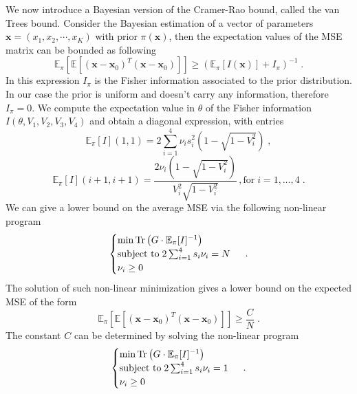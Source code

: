 \documentclass[aps, pra, 10pt, twocolumn, superscriptaddress,floatfix]{revtex4-1}
\DeclareMathOperator{\tr}{Tr}
\begin{document}
We now introduce a Bayesian version of the Cramer-Rao bound, called the van Trees bound. Consider the Bayesian estimation of a vector of parameters $\boldsymbol{x} = (x_1, x_2, \cdots, x_K)$ with prior $\pi (\boldsymbol{x})$, then the expectation values of the MSE matrix can be bounded as following
%
\begin{equation}
	\mathbb{E}_\pi \left[ \mathbb{E} \left[ (\boldsymbol{x} - \boldsymbol{x}_0)^T  (\boldsymbol{x} - \boldsymbol{x}_0) \right] \right] \ge \left( \mathbb{E}_\pi [I(\boldsymbol{x})] + I_\pi \right)^{-1} \; .
\end{equation}
%
In this expression $I_\pi$ is the Fisher information associated to the prior distribution. In our case the prior is uniform and doesn't carry any information, therefore $I_\pi = 0$. We compute the expectation value in $\theta$ of the Fisher information $I(\theta, V_1, V_2, V_3, V_4)$ and obtain a diagonal expression, with entries
%
\begin{equation}
	\mathbb{E}_\pi [ I](1, 1) = 2 \sum_{i=1}^4 \nu_i s_i^2 \left( 1 - \sqrt{1-V_i^2}\right) \; ,
\end{equation}
%
\begin{equation}
	\mathbb{E}_\pi [ I] (i+1, i+1) = \frac{2 \nu_i \left( 1 - \sqrt{1-V_i^2} \right)}{V_i^2 \sqrt{1-V_i^2}}\, , \text{for} \; i=1, \dots, 4 \; .
\end{equation}
%
We can give a lower bound on the average MSE via the following non-linear program
%
\begin{equation}
    \begin{cases}
	\min \tr \left( G \cdot \mathbb{E}_\pi [ I]^{-1} \right)\\
	\text{subject to} \; 2 \sum_{i=1}^4 s_i \nu_i = N \\
	\nu_i \ge 0 
	\end{cases}\\
	\; .
	\label{eq:semidefinite}
\end{equation}
%
The solution of such non-linear minimization gives a lower bound on the expected MSE of the form 
%
\begin{equation}
	\mathbb{E}_\pi \left[ \mathbb{E} \left[ (\boldsymbol{x} - \boldsymbol{x}_0)^T  (\boldsymbol{x} - \boldsymbol{x}_0) \right] \right] \ge \frac{C}{N} \; .
	\label{eq:vanTrees}
\end{equation}
%
The constant $C$ can be determined by solving the non-linear program
%
\begin{equation}
	 \begin{cases}
	\min \tr \left( G \cdot \mathbb{E}_\pi [ I]^{-1} \right)\\
	\text{subject to} \; 2 \sum_{i=1}^4 s_i \nu_i = 1 \\
	\nu_i \ge 0 
	\end{cases}\\
	\; .
\end{equation}
\end{document}
